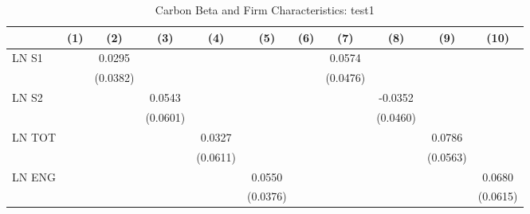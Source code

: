 \begin{table}[htbp]\centering
\def\sym#1{\ifmmode^{#1}\else\(^{#1}\)\fi}
\caption{Carbon Beta and Firm Characteristics: test1}
\begin{tabular}{l*{10}{c}}
\hline\hline
                &\multicolumn{1}{c}{(1)}         &\multicolumn{1}{c}{(2)}         &\multicolumn{1}{c}{(3)}         &\multicolumn{1}{c}{(4)}         &\multicolumn{1}{c}{(5)}         &\multicolumn{1}{c}{(6)}         &\multicolumn{1}{c}{(7)}         &\multicolumn{1}{c}{(8)}         &\multicolumn{1}{c}{(9)}         &\multicolumn{1}{c}{(10)}         \\
\hline
LN S1           &                  &   0.0295         &                  &                  &                  &                  &   0.0574         &                  &                  &                  \\
                &                  & (0.0382)         &                  &                  &                  &                  & (0.0476)         &                  &                  &                  \\
LN S2           &                  &                  &   0.0543         &                  &                  &                  &                  &  -0.0352         &                  &                  \\
                &                  &                  & (0.0601)         &                  &                  &                  &                  & (0.0460)         &                  &                  \\
LN TOT          &                  &                  &                  &   0.0327         &                  &                  &                  &                  &   0.0786         &                  \\
                &                  &                  &                  & (0.0611)         &                  &                  &                  &                  & (0.0563)         &                  \\
LN ENG          &                  &                  &                  &                  &   0.0550         &                  &                  &                  &                  &   0.0680         \\
                &                  &                  &                  &                  & (0.0376)         &                  &                  &                  &                  & (0.0615)         \\

\end{tabular}
\end{table}
